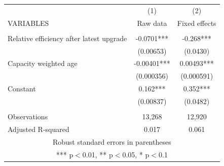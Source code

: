 \scriptsize
\begin{tabular}{lcc} \hline
 & (1) & (2) \\
VARIABLES & Raw data & Fixed effects \\ \hline
 &  &  \\
Relative efficiency after latest upgrade & -0.0701*** & -0.268*** \\
 & (0.00653) & (0.0430) \\
Capacity weighted age & -0.00401*** & 0.00493*** \\
 & (0.000356) & (0.000591) \\
Constant & 0.162*** & 0.352*** \\
 & (0.00837) & (0.0482) \\
 &  &  \\
Observations & 13,268 & 12,920 \\
 Adjusted R-squared & 0.017 & 0.061 \\ \hline
\multicolumn{3}{c}{ Robust standard errors in parentheses} \\
\multicolumn{3}{c}{ *** p$<$0.01, ** p$<$0.05, * p$<$0.1} \\
\end{tabular}
